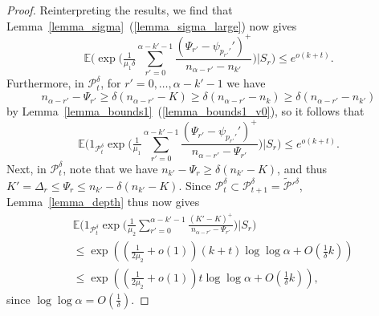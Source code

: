 \documentclass{article}
\theoremstyle{plain}
\theoremstyle{remark}
\theoremstyle{plain}
\numberwithin{equation}{section}
\begin{document}
\begin{proof}
		Reinterpreting the results, we find that Lemma~\ref{lemma_sigma}~(\ref{lemma_sigma_large}) now gives $$\mathbb{E}\Bigg(\exp\Bigg(\tfrac{1}{\mu_1\delta}\sum_{r'=0}^{\alpha-k'-1}\frac{(\Psi_{r'}-\psi_{p_{r'}'}')^+}{n_{\alpha-r'}-n_{k'}}\Bigg)\Bigg|S_r\Bigg)\leq e^{o(k+t)}.$$ Furthermore, in $\mathcal{P}_t^{\delta}$, for $r'=0,\ldots,\alpha-k'-1$ we have $$n_{\alpha-r'}-\Psi_{r'}\geq\delta(n_{\alpha-r'}-K)\geq\delta(n_{\alpha-r'}-n_k)\geq\delta(n_{\alpha-r'}-n_{k'})$$ by Lemma~\ref{lemma_bounds1}~(\ref{lemma_bounds1_v0}), so it follows that $$\mathbb{E}\Bigg(1_{\mathcal{P}_t^{\delta}}\exp\Bigg(\tfrac{1}{\mu_1}\sum_{r'=0}^{\alpha-k'-1}\frac{(\Psi_{r'}-\psi_{p_{r'}'}')^+}{n_{\alpha-r'}-\Psi_{r'}}\Bigg)\Bigg|S_r\Bigg)\leq e^{o(k+t)}.$$ Next, in $\mathcal{P}_t^{\delta}$, note that we have $n_{k'}-\Psi_r\geq\delta(n_{k'}-K)$, and thus $K'=\Delta_r\leq\Psi_r\leq n_{k'}-\delta(n_{k'}-K)$. Since $\mathcal{P}_t^{\delta}\subset\mathcal{P}_{t+1}^{\delta}=\widetilde{\mathcal{P}}'^{\delta}$, Lemma~\ref{lemma_depth} thus now gives
		\begin{align}
			&\mathbb{E}\Bigg(1_{\mathcal{P}_t^{\delta}}\exp\Bigg(\tfrac1{\mu_2}\sum_{r'=0}^{\alpha-k'-1}\frac{(K'-K)^+}{n_{\alpha-r'}-\Psi_{r'}}\Bigg)\Bigg|S_r\Bigg)
			\\&\leq\exp\left((\tfrac{1}{2\mu_2}+o(1))(k+t)\log\log\alpha+O(\tfrac1{\delta}k)\right)
			\\&\leq\exp\left((\tfrac{1}{2\mu_2}+o(1))t\log\log\alpha+O(\tfrac1{\delta}k)\right),
		\end{align}
		since $\log\log\alpha=O(\tfrac{1}{\delta})$.
		

\end{proof}
\end{document}
